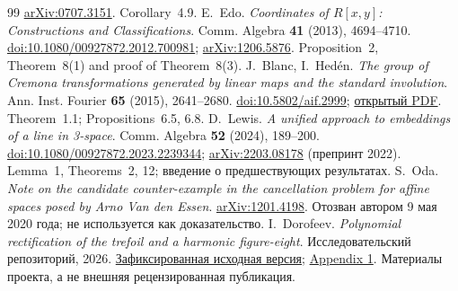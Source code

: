 \begin{thebibliography}{99}
\href{https://arxiv.org/abs/0707.3151}{arXiv:0707.3151}.
Corollary~4.9.
E.~Edo. \emph{Coordinates of $R[x,y]$: Constructions and Classifications}.
Comm. Algebra \textbf{41} (2013), 4694--4710.
\href{https://doi.org/10.1080/00927872.2012.700981}{doi:10.1080/00927872.2012.700981};
\href{https://arxiv.org/abs/1206.5876}{arXiv:1206.5876}.
Proposition~2, Theorem~8(1) and proof of Theorem~8(3).
J.~Blanc, I.~Hedén. \emph{The group of Cremona transformations generated
by linear maps and the standard involution}.
Ann. Inst. Fourier \textbf{65} (2015), 2641--2680.
\href{https://doi.org/10.5802/aif.2999}{doi:10.5802/aif.2999};
\href{https://www.numdam.org/item/10.5802/aif.2999.pdf}{открытый PDF}.
Theorem~1.1; Propositions~6.5, 6.8.
D.~Lewis. \emph{A unified approach to embeddings of a line in 3-space}.
Comm. Algebra \textbf{52} (2024), 189--200.
\href{https://doi.org/10.1080/00927872.2023.2239344}{doi:10.1080/00927872.2023.2239344};
\href{https://arxiv.org/abs/2203.08178}{arXiv:2203.08178} (препринт 2022).
Lemma~1, Theorems~2, 12; введение о предшествующих результатах.
S.~Oda. \emph{Note on the candidate counter-example in the cancellation
problem for affine spaces posed by Arno Van den Essen}.
\href{https://arxiv.org/abs/1201.4198}{arXiv:1201.4198}.
Отозван автором 9 мая 2020 года; не используется как доказательство.
I.~Dorofeev. \emph{Polynomial rectification of the trefoil and a harmonic
figure-eight}. Исследовательский репозиторий, 2026.
\href{https://github.com/qft98romanov-hash/abhyankar-moh-trefoil/tree/b954f3609e900761fddc9c8ff03d8301e9604cab}{Зафиксированная исходная версия};
\href{https://github.com/qft98romanov-hash/abhyankar-moh-trefoil/tree/b954f3609e900761fddc9c8ff03d8301e9604cab/appendices/2026-10-26-harmonic-lnd}{Appendix 1}.
Материалы проекта, а не внешняя рецензированная публикация.
\end{thebibliography}

